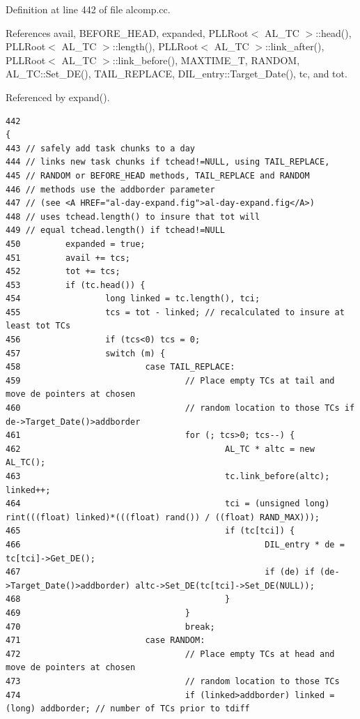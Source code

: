 Definition at line 442 of file alcomp.cc.

References avail, BEFORE\_\-HEAD, expanded, PLLRoot$<$ AL\_\-TC $>$::head(), PLLRoot$<$ AL\_\-TC $>$::length(), PLLRoot$<$ AL\_\-TC $>$::link\_\-after(), PLLRoot$<$ AL\_\-TC $>$::link\_\-before(), MAXTIME\_\-T, RANDOM, AL\_\-TC::Set\_\-DE(), TAIL\_\-REPLACE, DIL\_\-entry::Target\_\-Date(), tc, and tot.

Referenced by expand().



\footnotesize\begin{verbatim}442                                                                             {
443 // safely add task chunks to a day
444 // links new task chunks if tchead!=NULL, using TAIL_REPLACE,
445 // RANDOM or BEFORE_HEAD methods, TAIL_REPLACE and RANDOM
446 // methods use the addborder parameter
447 // (see <A HREF="al-day-expand.fig">al-day-expand.fig</A>)
448 // uses tchead.length() to insure that tot will
449 // equal tchead.length() if tchead!=NULL
450         expanded = true;
451         avail += tcs;
452         tot += tcs;
453         if (tc.head()) {
454                 long linked = tc.length(), tci;
455                 tcs = tot - linked; // recalculated to insure at least tot TCs
456                 if (tcs<0) tcs = 0;
457                 switch (m) {
458                         case TAIL_REPLACE:
459                                 // Place empty TCs at tail and move de pointers at chosen
460                                 // random location to those TCs if de->Target_Date()>addborder
461                                 for (; tcs>0; tcs--) {
462                                         AL_TC * altc = new AL_TC();
463                                         tc.link_before(altc); linked++;
464                                         tci = (unsigned long) rint(((float) linked)*(((float) rand()) / ((float) RAND_MAX)));
465                                         if (tc[tci]) {
466                                                 DIL_entry * de = tc[tci]->Get_DE();
467                                                 if (de) if (de->Target_Date()>addborder) altc->Set_DE(tc[tci]->Set_DE(NULL));
468                                         }
469                                 }
470                                 break;
471                         case RANDOM:
472                                 // Place empty TCs at head and move de pointers at chosen
473                                 // random location to those TCs
474                                 if (linked>addborder) linked = (long) addborder; // number of TCs prior to tdiff

\end{verbatim}
